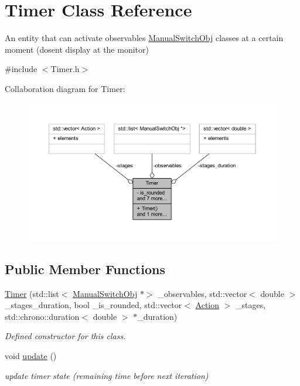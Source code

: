 \hypertarget{class_timer}{}\section{Timer Class Reference}
\label{class_timer}


An entity that can activate observables \hyperlink{class_manual_switch_obj}{Manual\+Switch\+Obj} classes at a certain moment (dosen\textquotesingle{}t display at the monitor)  




{\ttfamily \#include $<$Timer.\+h$>$}



Collaboration diagram for Timer\+:\nopagebreak
\begin{figure}[H]
\begin{center}
\leavevmode
\includegraphics[width=350pt]{class_timer__coll__graph}
\end{center}
\end{figure}
\subsection*{Public Member Functions}
\begin{DoxyCompactItemize}
\item 
\hyperlink{class_timer_a18ad778fac9c2ccf488d4fa2e64b5d75}{Timer} (std\+::list$<$ \hyperlink{class_manual_switch_obj}{Manual\+Switch\+Obj} $\ast$$>$ \+\_\+observables, std\+::vector$<$ double $>$ \+\_\+stages\+\_\+duration, bool \+\_\+is\+\_\+rounded, std\+::vector$<$ \hyperlink{_manual_switch_obj_8h_a8bb1ef53467e4f61410d12822d922498}{Action} $>$ \+\_\+stages, std\+::chrono\+::duration$<$ double $>$ $\ast$\+\_\+duration)
\begin{DoxyCompactList}\small\item\em Defined constructor for this class. \end{DoxyCompactList}\item 
\mbox{\label{class_timer_a745ad59b5a46744cd871a1129a25d74f}} 
void \hyperlink{class_timer_a745ad59b5a46744cd871a1129a25d74f}{update} ()
\begin{DoxyCompactList}\small\item\em update timer state (remaining time before next iteration) \end{DoxyCompactList}\end{DoxyCompactItemize}
